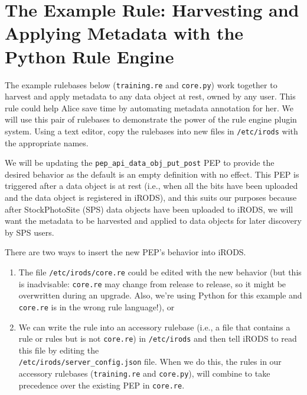 \documentclass[10pt,oneside]{memoir}
\begin{document}
\section{The Example Rule: Harvesting and Applying Metadata with the Python Rule Engine}

The example rulebases below (\texttt{training.re} and \texttt{core.py}) work together to harvest and apply metadata to any data object at rest, owned by any user. This rule could help Alice save time by automating metadata annotation for her. We will use this pair of rulebases to demonstrate the power of the rule engine plugin system. Using a text editor, copy the rulebases into new files in \texttt{/etc/irods} with the appropriate names.

\vspace{5mm}
\begin{lrbox}{\lstTrainingRuleBase}

\end{lrbox}
\href{https://raw.githubusercontent.com/irods/irods_training/ugm2024/beginner/training.re}{\usebox{\lstTrainingRuleBase}}

\vspace{5mm}
\begin{lrbox}{\lstPythonRulebase}

\end{lrbox}
\href{https://raw.githubusercontent.com/irods/irods_training/ugm2024/beginner/core.py}{\usebox{\lstPythonRulebase}}

We will be updating the \texttt{pep\_api\_data\_obj\_put\_post} PEP to provide the desired behavior as the default is an empty definition with no effect.  This PEP is triggered after a data object is at rest (i.e., when all the bits have been uploaded and the data object is registered in iRODS), and this suits our purposes because after StockPhotoSite (SPS) data objects have been uploaded to iRODS, we will want the metadata to be harvested and applied to data objects for later discovery by SPS users.

There are two ways to insert the new PEP's behavior into iRODS.
\begin{enumerate}
 \item The file \texttt{/etc/irods/core.re} could be edited with the new behavior (but this is inadvisable: \texttt{core.re} may change from release to release, so it might be overwritten during an upgrade.  Also, we're using Python for this example and \texttt{core.re} is in the wrong rule language!), or
 \item We can write the rule into an accessory rulebase (i.e., a file that contains a rule or rules but is not \texttt{core.re}) in \texttt{/etc/irods} and then tell iRODS to read this file by editing the \\ \texttt{/etc/irods/server\_config.json} file. When we do this, the rules in our accessory rulebases (\texttt{training.re} and \texttt{core.py}), will combine to take precedence over the existing PEP in \texttt{core.re}.
\end{enumerate}
\end{document}
